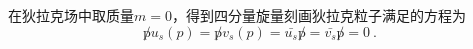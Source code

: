 
\begin{issues}
\issueDraft
\end{issues}

在狄拉克场中取质量$m=0$，得到四分量旋量刻画狄拉克粒子满足的方程为
\begin{equation}
\not p u_s (p) = \not p v_s(p) = \bar{u_s}\not p = \bar{v_s}\not p = 0~.
\end{equation}


